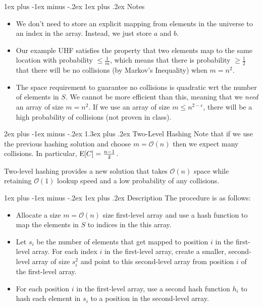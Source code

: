 \documentclass[11pt]{article}
\makeatletter
\renewcommand{\section}{\@startsection{section}{1}{0mm}%
                                 {2ex plus -1ex minus -.2ex}%
                                 {1.3ex plus .2ex}%
                                 {\normalfont\Large\bfseries}}%
\renewcommand{\subsection}{\@startsection{subsection}{2}{0mm}%
                                   {1ex plus -1ex minus -.2ex}%
                                   {1ex plus .2ex}%
                                   {\normalfont\large\bfseries}}%
\newcommand{\expc}{{\bf {\rm E}}}
\newcommand{\bigo}{\mathcal{O}}
\makeatother
\begin{document}
\subsection{Notes}
\begin{itemize}
    \item 
    We don't need to store an explicit mapping from elements in the universe to an index in the array. Instead, we just store $a$ and $b$.
    
    \item 
    Our example UHF satisfies the property that two elements map to the same location with probability $\leq \frac{1}{m}$, which means that there is probability $\geq \frac{1}{2}$ that there will be no collisions (by Markov's Inequality) when $m = n^2$.
    
    \item
    The space requirement to guarantee no collisions is quadratic wrt the number of elements in $S$. We cannot be more efficient than this, meaning that we \textit{need} an array of size $m = n^2$. If we use an array of size $m \leq n^{2-\epsilon}$, there will be a high probability of collisions (not proven in class).
    
\end{itemize}

\section{Two-Level Hashing}
Note that if we use the previous hashing solution and choose $m = \bigo(n)$ then we expect many collisions. In particular, $\expc[C] = \frac{n-1}{2}$. 

Two-level hashing provides a new solution that takes $\bigo(n)$ space while retaining $\bigo(1)$ lookup speed and a low probability of any collisions. 

\subsection{Description}
The procedure is as follows:
\begin{itemize}
    \item Allocate a size $m = \bigo(n)$ size first-level array and use a hash function to map the elements in $S$ to indices in the this array.
    \item Let $s_i$ be the number of elements that get mapped to position $i$ in the first-level array. For each index $i$ in the first-level array, create a smaller, second-level array of size $s_i^2$ and point to this second-level array from position $i$ of the first-level array.
    \item For each position $i$ in the first-level array, use a second hash function $h_i$ to hash each element in $s_i$ to a position in the second-level array.
\end{itemize}
\end{document}

